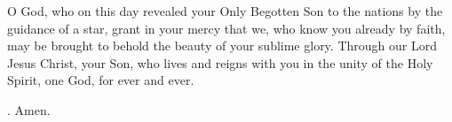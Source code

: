 \lettrine[lines=3]{O}{} God, who on this day
revealed your Only Begotten Son to the nations
by the guidance of a star,
grant in your mercy
that we, who know you already by faith,
may be brought to behold the beauty of your sublime glory.
Through our Lord Jesus Christ, your Son,
who lives and reigns with you in the unity of the Holy Spirit,
one God, for ever and ever. \par \Rbar. Amen. 